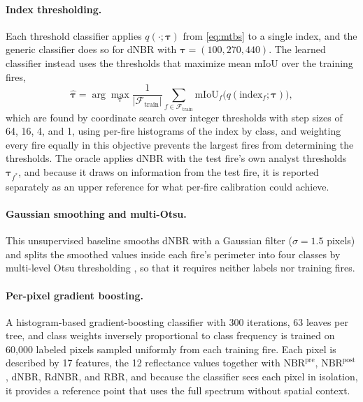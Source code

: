 \documentclass[10pt]{article}
\begin{document}
\paragraph{Index thresholding.}
Each threshold classifier applies $q(\cdot; \boldsymbol{\tau})$ from \cref{eq:mtbs} to a single index, and the generic classifier does so for dNBR with $\boldsymbol{\tau} = (100, 270, 440)$.
The learned classifier instead uses the thresholds that maximize mean mIoU over the training fires,
\begin{equation}
  \hat{\boldsymbol{\tau}} = \arg\max_{\boldsymbol{\tau}} \frac{1}{|\mathcal{F}_{\text{train}}|} \sum_{f \in \mathcal{F}_{\text{train}}} \mathrm{mIoU}_f\big(q(\mathrm{index}_f; \boldsymbol{\tau})\big),
\end{equation}
which are found by coordinate search over integer thresholds with step sizes of 64, 16, 4, and 1, using per-fire histograms of the index by class, and weighting every fire equally in this objective prevents the largest fires from determining the thresholds.
The oracle applies dNBR with the test fire's own analyst thresholds $\boldsymbol{\tau}_{f^*}$, and because it draws on information from the test fire, it is reported separately as an upper reference for what per-fire calibration could achieve.

\paragraph{Gaussian smoothing and multi-Otsu.}
This unsupervised baseline smooths dNBR with a Gaussian filter ($\sigma = 1.5$ pixels) and splits the smoothed values inside each fire's perimeter into four classes by multi-level Otsu thresholding \citep{otsu1979threshold}, so that it requires neither labels nor training fires.

\paragraph{Per-pixel gradient boosting.}
A histogram-based gradient-boosting classifier \citep{ke2017lightgbm, pedregosa2011sklearn} with 300 iterations, 63 leaves per tree, and class weights inversely proportional to class frequency is trained on 60{,}000 labeled pixels sampled uniformly from each training fire.
Each pixel is described by 17 features, the 12 reflectance values together with $\mathrm{NBR}^{\text{pre}}$, $\mathrm{NBR}^{\text{post}}$, dNBR, RdNBR, and RBR, and because the classifier sees each pixel in isolation, it provides a reference point that uses the full spectrum without spatial context.
\end{document}
